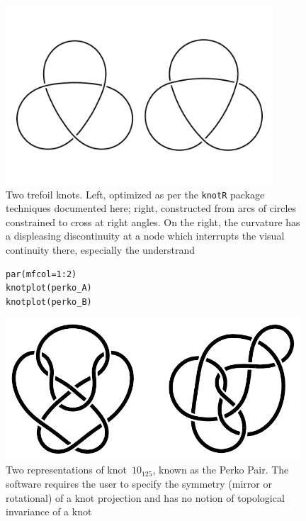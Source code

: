 \documentclass{birkjour}
\theoremstyle{definition}
\theoremstyle{remark}
\numberwithin{equation}{section}
\begin{document}
\begin{figure}[h]
  \centering  
    \includegraphics[width=10cm]{two_trefoil_knots_post_inkscape.pdf}
    \caption{Two trefoil \label{two_trefoil_knots} knots.  Left,
      optimized as per the {\tt knotR} package techniques documented
      here; right, constructed from arcs of circles constrained to
      cross at right angles.    On the right, the curvature
      has a displeasing discontinuity at a node which interrupts
      the visual continuity there, especially the understrand}
\end{figure}

\begin{figure}[htbp]
  \begin{center}
\begin{verbatim}
par(mfcol=1:2)
knotplot(perko_A)
knotplot(perko_B)
\end{verbatim}
\includegraphics[width=11cm]{knot-perko_A_and_B}  %
\caption{Two representations of knot~$10_{125}$, known as the 
  \label{perko_AB}  Perko Pair.  The software requires the user to
  specify the symmetry (mirror or rotational) of a knot projection and
  has no notion of topological invariance of a knot}
  \end{center}
\end{figure}
\end{document}
